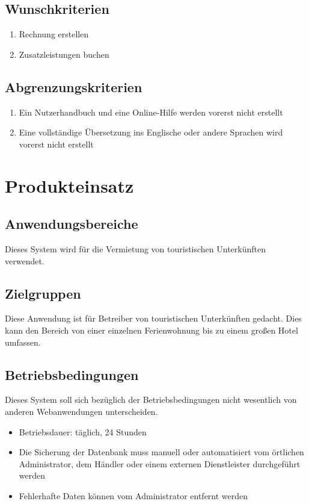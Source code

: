 \documentclass[a4paper,oneside,10pt]{scrreprt}
\begin{document}
\section{Wunschkriterien}

\begin{enumerate}
\item Rechnung erstellen
\item Zusatzleistungen buchen
\end{enumerate}

\section{Abgrenzungskriterien}
\begin{enumerate}
\item Ein Nutzerhandbuch und eine Online-Hilfe werden vorerst nicht erstellt
\item Eine vollständige Übersetzung ins Englische oder andere 
Sprachen wird vorerst nicht erstellt
\end{enumerate}





\chapter{Produkteinsatz}
\section{Anwendungsbereiche}

Dieses System wird für die Vermietung von touristischen Unterkünften verwendet.


\section{Zielgruppen}

Diese Anwendung ist für Betreiber von touristischen Unterkünften 
gedacht. Dies kann den Bereich von einer einzelnen Ferienwohnung bis zu 
einem großen Hotel umfassen.

\section{Betriebsbedingungen}
Dieses System soll sich bezüglich der Betriebsbedingungen nicht wesentlich von anderen Webanwendungen unterscheiden.

\begin{itemize}
\item Betriebsdauer: täglich, 24 Stunden
\item Die Sicherung der Datenbank muss manuell oder automatisiert vom örtlichen Administrator, dem Händler oder einem externen Dienstleister durchgeführt werden
\item Fehlerhafte Daten können vom Administrator entfernt werden
\end{itemize}
\end{document}
